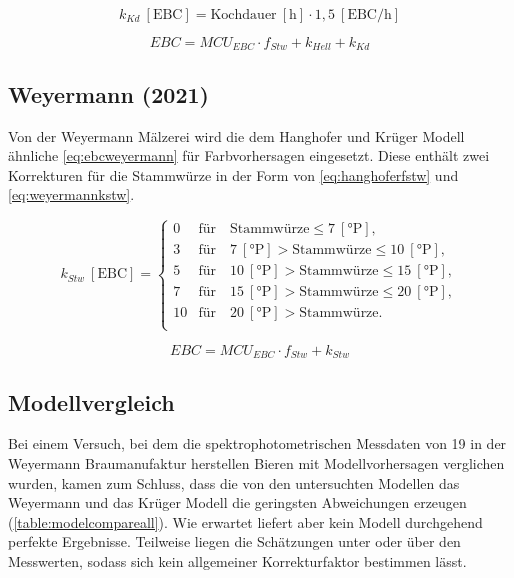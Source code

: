 \documentclass[a4paper,parskip=half]{scrartcl}
\newcommand{\MCUEBC}{\mathit{MCU}_{EBC}}
\newcommand{\EBC}{\mathit{EBC}}
\newcommand{\uebc}{\:[\textrm{EBC}]}
\newcommand{\uebch}{\:[\textrm{EBC/h}]}
\newcommand{\uplato}{\:[\textrm{°P}]}
\newcommand{\fstw}{f_{Stw}}
\newcommand{\khell}{k_{Hell}}
\newcommand{\kkd}{k_{Kd}}
\newcommand{\kstw}{k_{Stw}}
\newcommand{\uhour}{\:[\textrm{h}]}
\begin{document}
\begin{equation}
\kkd \uebc = \text{Kochdauer} \uhour \cdot 1,5 \uebch
\label{eq:krugerkkd}
\end{equation}

\begin{equation}
\EBC = \MCUEBC \cdot \fstw + \khell + \kkd
\label{eq:ebckruger}
\end{equation}

\subsection*{Weyermann (2021)}

Von der Weyermann Mälzerei wird die dem Hanghofer und Krüger Modell ähnliche \autoref{eq:ebcweyermann} für Farbvorhersagen eingesetzt. Diese enthält zwei Korrekturen für die Stammwürze in der Form von \autoref{eq:hanghoferfstw} und \autoref{eq:weyermannkstw}. \parencite{KrausWeyermann2021b}

\begin{equation}
\kstw \uebc = \begin{cases}
0  & \text{für} \quad \text{Stammwürze} \le 7 \uplato, \\
3  & \text{für} \quad 7 \uplato > \text{Stammwürze} \le 10 \uplato, \\
5  & \text{für} \quad 10 \uplato > \text{Stammwürze} \le 15 \uplato, \\
7  & \text{für} \quad 15 \uplato > \text{Stammwürze} \le 20 \uplato, \\
10 & \text{für} \quad 20 \uplato > \text{Stammwürze}. \\
\end{cases}
\label{eq:weyermannkstw}
\end{equation}

\begin{equation}
\EBC = \MCUEBC \cdot \fstw + \kstw
\label{eq:ebcweyermann}
\end{equation}

\subsection*{Modellvergleich}

Bei einem Versuch, bei dem die spektrophotometrischen Messdaten von 19 in der Weyermann Braumanufaktur herstellen Bieren mit Modellvorhersagen verglichen wurden, kamen \textcite{KrausWeyermann2021b} zum Schluss, dass die von den untersuchten Modellen das Weyermann und das Krüger Modell die geringsten Abweichungen erzeugen (\autoref{table:modelcompareall}). Wie erwartet liefert aber kein Modell durchgehend perfekte Ergebnisse. Teilweise liegen die Schätzungen unter oder über den Messwerten, sodass sich kein allgemeiner Korrekturfaktor bestimmen lässt.
\end{document}
